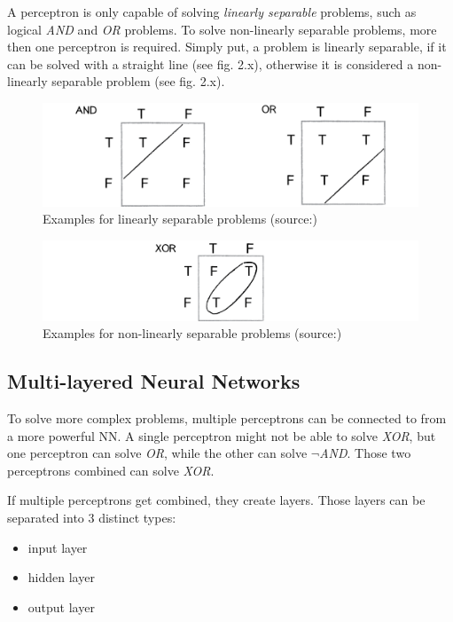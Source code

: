 A perceptron is only capable of solving \emph{linearly separable} problems, such as logical \emph{AND} and \emph{OR} problems. To solve non-linearly separable problems, more then one perceptron is required\cite{Rosenblatt58}. Simply put, a problem is linearly separable, if it can be solved with a straight line (see fig. 2.x), otherwise it is considered a non-linearly separable problem (see fig. 2.x).

\begin{figure}[H]
	\begin{center}
		\includegraphics[scale=0.6]{img/lsp.png}
		\caption{Examples for linearly separable problems (source:\cite{Shiffman12})}
		\label{fig:fig2.7}
	\end{center}
\end{figure}

\begin{figure}[H]
	\begin{center}
		\includegraphics[scale=0.75]{img/nlsp.png}
		\caption{Examples for non-linearly separable problems (source:\cite{Shiffman12})}
		\label{fig:fig2.8}
	\end{center}
\end{figure}


\subsection{Multi-layered Neural Networks}
To solve more complex problems, multiple perceptrons can be connected to from a more powerful NN. A single perceptron might not be able to solve \emph{XOR}, but one perceptron can solve \emph{OR}, while the other can solve \emph{$\neg$AND}. Those two perceptrons combined can solve \emph{XOR}\cite{Shiffman12}.

If multiple perceptrons get combined, they create layers. Those layers can be separated into 3 distinct types\cite{Stergiou96}:
\begin{itemize}
	\item input layer
	\item hidden layer
	\item output layer
\end{itemize}

